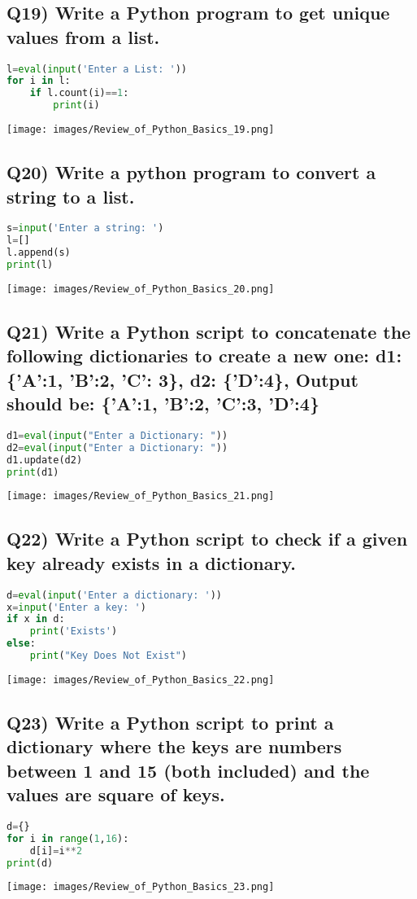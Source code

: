 \documentclass{article}
\begin{document}
\subsection*{Q19) Write a Python program to get unique values from a list.}
\begin{lstlisting}[language=Python]
l=eval(input('Enter a List: '))
for i in l:
    if l.count(i)==1:
        print(i)
\end{lstlisting}
\texttt{[image: images/Review\_of\_Python\_Basics\_19.png]}

\subsection*{Q20) Write a python program to convert a string to a list.}
\begin{lstlisting}[language=Python]
s=input('Enter a string: ')
l=[]
l.append(s)
print(l)
\end{lstlisting}
\texttt{[image: images/Review\_of\_Python\_Basics\_20.png]}

\subsection*{Q21) Write a Python script to concatenate the following dictionaries to create a new one: d1: \{'A':1, 'B':2, 'C': 3\}, d2: \{'D':4\}, Output should be: \{'A':1, 'B':2, 'C':3, 'D':4\}}
\begin{lstlisting}[language=Python]
d1=eval(input("Enter a Dictionary: "))
d2=eval(input("Enter a Dictionary: "))
d1.update(d2)
print(d1)
\end{lstlisting}
\texttt{[image: images/Review\_of\_Python\_Basics\_21.png]}

\subsection*{Q22) Write a Python script to check if a given key already exists in a dictionary.}
\begin{lstlisting}[language=Python]
d=eval(input('Enter a dictionary: '))
x=input('Enter a key: ')
if x in d:
    print('Exists')
else:
    print("Key Does Not Exist")
\end{lstlisting}
\texttt{[image: images/Review\_of\_Python\_Basics\_22.png]}

\subsection*{Q23) Write a Python script to print a dictionary where the keys are numbers between 1 and 15 (both included) and the values are square of keys.}
\begin{lstlisting}[language=Python]
d={}
for i in range(1,16):
    d[i]=i**2
print(d)
\end{lstlisting}
\texttt{[image: images/Review\_of\_Python\_Basics\_23.png]}
\end{document}
